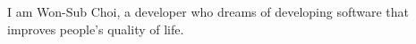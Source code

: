 

\begin{cvparagraph}

I am Won-Sub Choi, a developer who dreams of developing software that improves people's quality of life. 
\end{cvparagraph}
